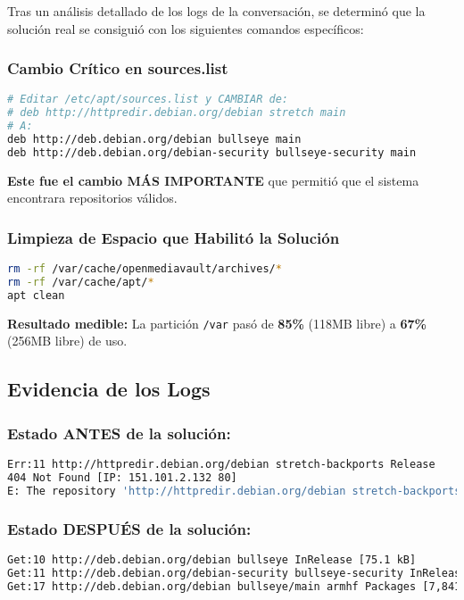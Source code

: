 \documentclass[12pt, a4paper]{article}
\begin{document}
Tras un análisis detallado de los logs de la conversación, se determinó que la solución real se consiguió con los siguientes comandos específicos:

\subsubsection{Cambio Crítico en sources.list}
\begin{lstlisting}[language=bash, caption=Cambio EXACTO que resolvió el problema]
# Editar /etc/apt/sources.list y CAMBIAR de:
# deb http://httpredir.debian.org/debian stretch main
# A:
deb http://deb.debian.org/debian bullseye main
deb http://deb.debian.org/debian-security bullseye-security main
\end{lstlisting}

\textbf{Este fue el cambio MÁS IMPORTANTE} que permitió que el sistema encontrara repositorios válidos.

\subsubsection{Limpieza de Espacio que Habilitó la Solución}
\begin{lstlisting}[language=bash, caption=Limpieza EXACTA que liberó espacio crítico]
rm -rf /var/cache/openmediavault/archives/*
rm -rf /var/cache/apt/*
apt clean
\end{lstlisting}

\textbf{Resultado medible:} La partición \texttt{/var} pasó de \textbf{85\%} (118MB libre) a \textbf{67\%} (256MB libre) de uso.

\subsection{Evidencia de los Logs}
\label{subsec:evidencia_logs}

\subsubsection{Estado ANTES de la solución:}
\begin{lstlisting}[language=bash, caption=Errores antes de la solución]
Err:11 http://httpredir.debian.org/debian stretch-backports Release
404 Not Found [IP: 151.101.2.132 80]
E: The repository 'http://httpredir.debian.org/debian stretch-backports Release' does no longer have a Release file.
\end{lstlisting}

\subsubsection{Estado DESPUÉS de la solución:}
\begin{lstlisting}[language=bash, caption=Descargas exitosas después de la solución]
Get:10 http://deb.debian.org/debian bullseye InRelease [75.1 kB]
Get:11 http://deb.debian.org/debian-security bullseye-security InRelease [27.2 kB]
Get:17 http://deb.debian.org/debian bullseye/main armhf Packages [7,841 kB]
\end{lstlisting}
\end{document}
